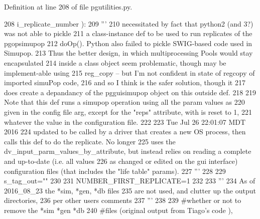 Definition at line 208 of file pgutilities.\+py.


\begin{DoxyCode}
208                                                 i\_replicate\_number ):
209     \textcolor{stringliteral}{'''}
210 \textcolor{stringliteral}{    necessitated by fact that python2 (and 3?) was not able to pickle }
211 \textcolor{stringliteral}{    a class-instance def to be used to run replicates of the pgopsimupop}
212 \textcolor{stringliteral}{    doOp().  Python also failed to pickle SWIG-based code used in Simupop.}
213 \textcolor{stringliteral}{    Thus the better design, in which  multiprocessing Pools would stay  encapsulated }
214 \textcolor{stringliteral}{    inside a class object seem problematic, though may be implement-able using }
215 \textcolor{stringliteral}{    reg\_copy -- but I'm not confident in state of regcopy of imported simuPop code,}
216 \textcolor{stringliteral}{    and so  I think is the safer solution, though it}
217 \textcolor{stringliteral}{    does create a depandancy of the pgguisimupop object on this outside def.  }
218 \textcolor{stringliteral}{}
219 \textcolor{stringliteral}{    Note that this def runs a simupop operation using all the param values as}
220 \textcolor{stringliteral}{    given in the config file arg, except for the "reps" attribute, with is reset to 1,}
221 \textcolor{stringliteral}{    whatever the value in the configuration file.}
222 \textcolor{stringliteral}{}
223 \textcolor{stringliteral}{    Tue Jul 26 22:01:07 MDT 2016}
224 \textcolor{stringliteral}{    updated to be called by a driver that creates a new OS process, then calls this def to do the
       replicate.  No longer}
225 \textcolor{stringliteral}{    uses the dv\_input\_parm\_values\_by\_attribute, but instead relies on reading a complete and up-to-date
       (i.e. all values}
226 \textcolor{stringliteral}{    as changed or edited on the gui interface) configuration files (that includes the "life table" params).}
227 \textcolor{stringliteral}{    '''}
228 
229     s\_tag\_out=\textcolor{stringliteral}{""}
230 
231     NUMBER\_FIRST\_REPLICATE=1
232 
233     \textcolor{stringliteral}{'''}
234 \textcolor{stringliteral}{    As of 2016\_08\_23 the *sim, *gen, *db files}
235 \textcolor{stringliteral}{    are not used, and clutter up the output directories,}
236 \textcolor{stringliteral}{    per other users comments}
237 \textcolor{stringliteral}{    '''}
238 
239     \textcolor{comment}{#whether or not to remove the *sim *gen *db}
240     \textcolor{comment}{#files (original output from Tiago's code ), }

\end{DoxyCode}
